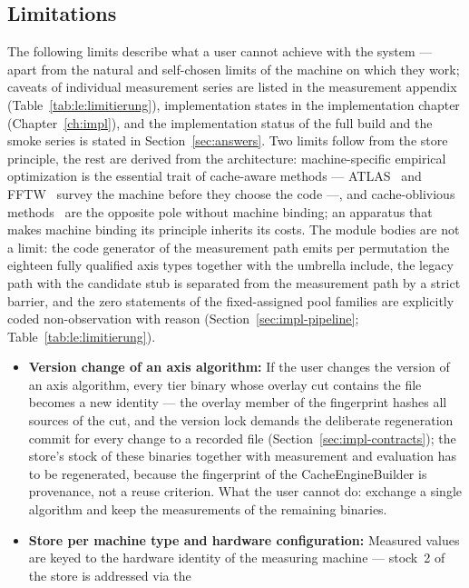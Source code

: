 \begin{nurlang}
\section{Limitations}\label{sec:limitations}
The following limits describe what a user cannot achieve with the system --- apart from the
natural and self-chosen limits of the machine on which they work; caveats of individual measurement
series are listed in the measurement appendix (Table~\ref{tab:le:limitierung}), implementation
states in the implementation chapter (Chapter~\ref{ch:impl}), and the implementation status of the
full build and the smoke series is stated in Section~\ref{sec:answers}. Two limits follow from the
store principle, the rest are derived from the architecture: machine-specific empirical
optimization is the essential trait of cache-aware methods --- ATLAS~\cite{whaley2001atlas} and
FFTW~\cite{frigo1998fftw} survey the machine before they choose the code ---, and cache-oblivious
methods~\cite{frigo1999cache} are the opposite pole without machine binding; an apparatus that
makes machine binding its principle inherits its costs. The module bodies are not a limit: the code
generator of the measurement path emits per permutation the eighteen fully qualified axis types
together with the umbrella include, the legacy path with the candidate stub is separated from the
measurement path by a strict barrier, and the zero statements of the fixed-assigned pool families
are explicitly coded non-observation with reason (Section~\ref{sec:impl-pipeline};
Table~\ref{tab:le:limitierung}).
\begin{itemize}
  \item \textbf{Version change of an axis algorithm:} If the user changes the version of an axis
  algorithm, every tier binary whose overlay cut contains the file becomes a new identity --- the
  overlay member of the fingerprint hashes all sources of the cut, and the version lock demands the
  deliberate regeneration commit for every change to a recorded file
  (Section~\ref{sec:impl-contracts}); the store's stock of these binaries together with measurement
  and evaluation has to be regenerated, because the fingerprint of the CacheEngineBuilder is
  provenance, not a reuse criterion. What the user cannot do: exchange a single algorithm and keep
  the measurements of the remaining binaries.
  \item \textbf{Store per machine type and hardware configuration:} Measured values are keyed to
  the hardware identity of the measuring machine --- stock~2 of the store is addressed via the

\end{itemize}
\end{nurlang}
